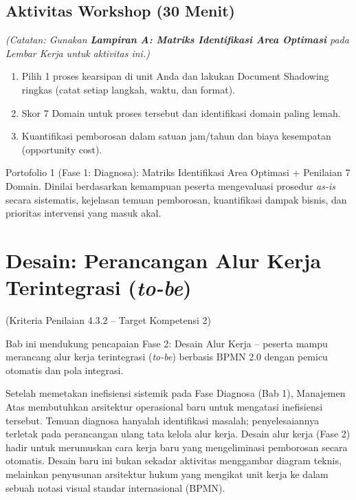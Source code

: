 \documentclass[12pt,a4paper]{report}
\begin{document}

\section{Aktivitas Workshop (30 Menit)}
\textit{(Catatan: Gunakan \textbf{Lampiran A: Matriks Identifikasi Area Optimasi} pada Lembar Kerja untuk aktivitas ini.)}
\begin{enumerate}[leftmargin=*]
    \item Pilih 1 proses kearsipan di unit Anda dan lakukan Document Shadowing ringkas (catat setiap langkah, waktu, dan format).
    \item Skor 7 Domain untuk proses tersebut dan identifikasi domain paling lemah.
    \item Kuantifikasi pemborosan dalam satuan jam/tahun dan biaya kesempatan (opportunity cost).
\end{enumerate}

\begin{outputbox}
Portofolio 1 (Fase 1: Diagnosa): Matriks Identifikasi Area Optimasi + Penilaian 7 Domain. Dinilai berdasarkan kemampuan peserta mengevaluasi prosedur \textit{as-is} secara sistematis, kejelasan temuan pemborosan, kuantifikasi dampak bisnis, dan prioritas intervensi yang masuk akal.
\end{outputbox}


\chapter{Desain: Perancangan Alur Kerja Terintegrasi (\textit{to-be})}
(Kriteria Penilaian 4.3.2 -- Target Kompetensi 2)

Bab ini mendukung pencapaian Fase 2: Desain Alur Kerja -- peserta mampu merancang alur kerja terintegrasi (\textit{to-be}) berbasis BPMN 2.0 dengan pemicu otomatis dan pola integrasi. 

Setelah memetakan inefisiensi sistemik pada Fase Diagnosa (Bab 1), Manajemen Atas membutuhkan arsitektur operasional baru untuk mengatasi inefisiensi tersebut. Temuan diagnosa hanyalah identifikasi masalah; penyelesaiannya terletak pada perancangan ulang tata kelola alur kerja. Desain alur kerja (Fase 2) hadir untuk merumuskan cara kerja baru yang mengeliminasi pemborosan secara otomatis. Desain baru ini bukan sekadar aktivitas menggambar diagram teknis, melainkan penyusunan arsitektur hukum yang mengikat unit kerja ke dalam sebuah notasi visual standar internasional (BPMN).
\end{document}
